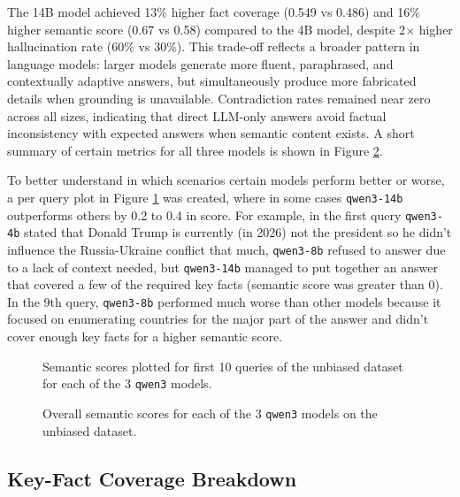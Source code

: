 \documentclass[conference]{IEEEtran}
\begin{document}
The 14B model achieved 13\% higher fact coverage (0.549 vs 0.486) and 16\% higher semantic score (0.67 vs 0.58) compared to the 4B model, despite 2$\times$ higher hallucination rate (60\% vs 30\%). This trade-off reflects a broader pattern in language models: larger models generate more fluent, paraphrased, and contextually adaptive answers, but simultaneously produce more fabricated details when grounding is unavailable. Contradiction rates remained near zero across all sizes, indicating that direct LLM-only answers avoid factual inconsistency with expected answers when semantic content exists. A short summary of certain metrics for all three models is shown in Figure \ref{fig:overall_semantic_scores}.

To better understand in which scenarios certain models perform better or worse, a per query plot in Figure \ref{fig:model_semantic_scores} was created, where in some cases \texttt{qwen3-14b} outperforms others by 0.2 to 0.4 in score. For example, in the first query \texttt{qwen3-4b} stated that Donald Trump is currently (in 2026) not the president so he didn't influence the Russia-Ukraine conflict that much, \texttt{qwen3-8b} refused to answer due to a lack of context needed, but \texttt{qwen3-14b} managed to put together an answer that covered a few of the required key facts (semantic score was greater than 0). In the 9th query, \texttt{qwen3-8b} performed much worse than other models because it focused on enumerating countries for the major part of the answer and didn't cover enough key facts for a higher semantic score.

\begin{figure}
\centering

\caption{Semantic scores plotted for first 10 queries of the unbiased dataset for each of the 3 \texttt{qwen3} models.}
\label{fig:model_semantic_scores}
\end{figure}

\begin{figure}
\centering

\caption{Overall semantic scores for each of the 3 \texttt{qwen3} models on the unbiased dataset.}
\label{fig:overall_semantic_scores}
\end{figure}

\subsection{Key-Fact Coverage Breakdown}
\end{document}

